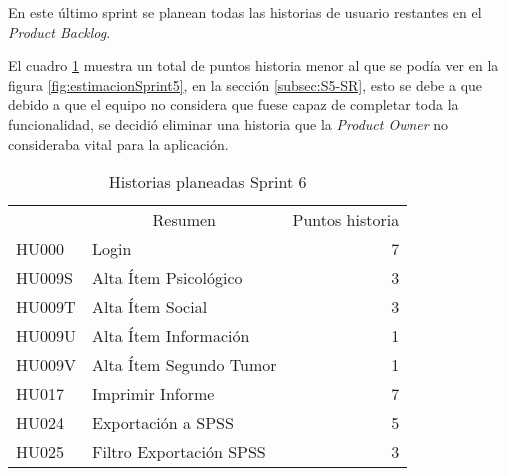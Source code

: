 En este último sprint se planean todas las historias de usuario restantes en el \emph{Product Backlog}. 

El cuadro \ref{historiasSprint6} muestra un total de puntos historia menor al que se podía ver en la figura \ref{fig:estimacionSprint5}, en la sección \ref{subsec:S5-SR}, esto se debe a que debido a que el equipo no considera que fuese capaz de completar toda la funcionalidad, se decidió eliminar una historia que la \emph{Product Owner} no consideraba vital para la aplicación.

\begin{table}[!h]
\centering
\caption{Historias planeadas Sprint 6}
\label{historiasSprint6}
\begin{tabular}{llr}
\rowcolor[HTML]{C0C0C0} 
\multicolumn{1}{c}{\cellcolor[HTML]{C0C0C0}Identificador} & \multicolumn{1}{c}{\cellcolor[HTML]{C0C0C0}Resumen} & \multicolumn{1}{c}{\cellcolor[HTML]{C0C0C0}Puntos historia} \\
HU000														& Login															& 7                                                          \\
\rowcolor[HTML]{EFEFEF} 
HU009S														& Alta Ítem Psicológico											& 3                                                           \\
HU009T														& Alta Ítem Social												& 3                                                          \\
\rowcolor[HTML]{EFEFEF} 
HU009U														& Alta Ítem Información											& 1                                                          
\\
HU009V														& Alta Ítem Segundo Tumor										& 1                                                          
\\
\rowcolor[HTML]{EFEFEF} 
HU017														& Imprimir Informe												& 7
\\
HU024														& Exportación a SPSS											& 5
\\
\rowcolor[HTML]{EFEFEF} 
HU025														& Filtro Exportación SPSS										& 3                                                          
\\
\end{tabular}
\end{table}


